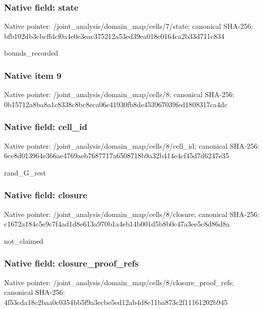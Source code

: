 \documentclass[10pt,a4paper]{article}
\begin{document}
\subsubsection{Native field: state}
Native pointer: /joint\_\allowbreak{}analysis/domain\_\allowbreak{}map/cells/7/state; canonical SHA-256: bfb102db3cbcffdcf0a4e0c3eac375212a53ed39ea018e0164ca2b33d711c834

\begingroup\raggedright\sloppy bounds\_\allowbreak{}recorded\par\endgroup

\subsubsection{Native item 9}
Native pointer: /joint\_\allowbreak{}analysis/domain\_\allowbreak{}map/cells/8; canonical SHA-256: 0b15712a8ba8a1c8338c8bc8eca06e41930fb8de453967039fed1808317ca4dc

\subsubsection{Native field: cell\_\allowbreak{}id}
Native pointer: /joint\_\allowbreak{}analysis/domain\_\allowbreak{}map/cells/8/cell\_\allowbreak{}id; canonical SHA-256: 6ce8d013964e366ae4769aeb7687717a6508718b9a32b414e4cf45d7d6247e35

\begingroup\raggedright\sloppy rand\_\allowbreak{}G\_\allowbreak{}rest\par\endgroup

\subsubsection{Native field: closure}
Native pointer: /joint\_\allowbreak{}analysis/domain\_\allowbreak{}map/cells/8/closure; canonical SHA-256: c1672a184c5e9c7f4ad1d8e613a970b1a4eb14b001d5b8b0c47a3ee5c8d86d8a

\begingroup\raggedright\sloppy not\_\allowbreak{}claimed\par\endgroup

\subsubsection{Native field: closure\_\allowbreak{}proof\_\allowbreak{}refs}
Native pointer: /joint\_\allowbreak{}analysis/domain\_\allowbreak{}map/cells/8/closure\_\allowbreak{}proof\_\allowbreak{}refs; canonical SHA-256: 4f53cda18c2baa0c0354bb5f9a3ecbe5ed12ab4d8e11ba873c2f11161202b945
\end{document}
